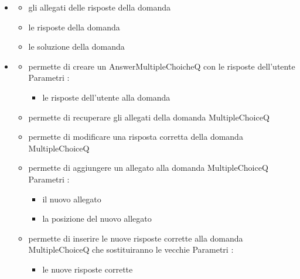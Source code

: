 \begin{itemize}
\item {}
\begin{itemize}
\item {}
\newline
gli allegati delle risposte della domanda
\item {}
\newline
le risposte della domanda
\item {}
\newline
le soluzione della domanda
\end{itemize}
\item {}
\begin{itemize}
\item {}
\newline
permette di creare un AnswerMultipleChoicheQ con le risposte dell'utente
\newline
Parametri :
\begin{itemize}
\item {}
\newline
le risposte dell'utente alla domanda
\end{itemize}
\item {}
\newline
permette di recuperare gli allegati della domanda MultipleChoiceQ
\newline
\item {}
\newline
permette di modificare una risposta corretta della domanda MultipleChoiceQ
\newline
\item {}
\newline
permette di aggiungere un allegato alla domanda MultipleChoiceQ
\newline
Parametri :
\begin{itemize}
\item {}
\newline
il nuovo allegato
\item {}
\newline
la posizione del nuovo allegato
\end{itemize}
\item {}
\newline
permette di inserire le nuove risposte corrette alla domanda MultipleChoiceQ che sostituiranno le vecchie
\newline
Parametri :
\begin{itemize}
\item {}
\newline
le nuove risposte corrette
\end{itemize}
\end{itemize}
\end{itemize}
